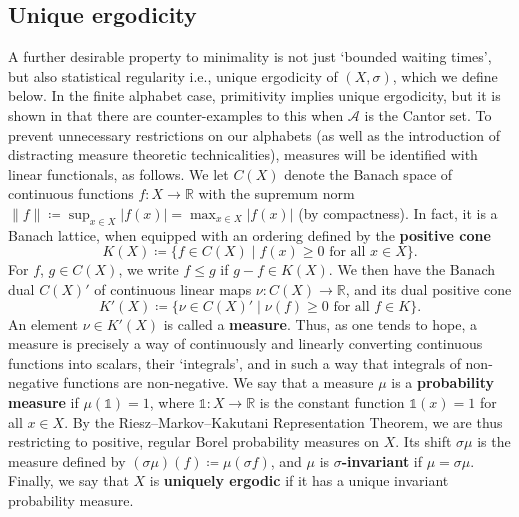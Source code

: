 \documentclass[11pt]{amsart}
\numberwithin{equation}{section}
\theoremstyle{plain}
\theoremstyle{definition}
\newcommand{\R}{{\mathbb R}}
\newcommand{\mc}{\mathcal}
\newcommand{\A}{\mc A}
\newcommand{\bbo}{\mathds{1}} %
\begin{document}
\subsection{Unique ergodicity}
A further desirable property to minimality is not just `bounded waiting times', but also statistical regularity i.e., unique ergodicity of \((X,\sigma)\), which we define below. In the finite alphabet case, primitivity implies unique ergodicity, but it is shown in \cite{DOP18} that there are counter-examples to this when \(\A\) is the Cantor set. To prevent unnecessary restrictions on our alphabets (as well as the introduction of distracting measure theoretic technicalities), measures will be identified with linear functionals, as follows. We let \(C(X)\) denote the Banach space of continuous functions \(f \colon X \to \R\) with the supremum norm \(\|f\| \coloneqq \sup_{x \in X} |f(x)| = \max_{x \in X} |f(x)|\) (by compactness). In fact, it is a Banach lattice, when equipped with an ordering defined by the \textbf{positive cone}
\[
K(X) \coloneqq \{f \in C(X) \mid f(x) \geq 0 \text{ for all } x \in X \} .
\]
For \(f\), \(g \in C(X)\), we write \(f \leq g\) if \(g-f \in K(X)\). We then have the Banach dual \(C(X)'\) of continuous linear maps \(\nu \colon C(X) \to \R\), and its dual positive cone
\[
K'(X) \coloneqq \{\nu \in C(X)' \mid \nu(f) \geq 0 \text{ for all } f \in K \} .
\]
An element \(\nu \in K'(X)\) is called a \textbf{measure}. Thus, as one tends to hope, a measure is precisely a way of continuously and linearly converting continuous functions into scalars, their `integrals', and in such a way that integrals of non-negative functions are non-negative. We say that a measure \(\mu\) is a \textbf{probability measure} if \(\mu(\bbo) = 1\), where \(\bbo \colon X \to \R\) is the constant function \(\bbo(x) = 1\) for all \(x \in X\). By the Riesz--Markov--Kakutani Representation Theorem, we are thus restricting to positive, regular Borel probability measures on \(X\). Its shift \(\sigma \mu\) is the measure defined by \((\sigma \mu)(f) \coloneqq \mu(\sigma f)\), and \(\mu\) is \textbf{\(\sigma\)-invariant} if \(\mu = \sigma \mu\). Finally, we say that \(X\) is \textbf{uniquely ergodic} if it has a unique invariant probability measure.
\end{document}
